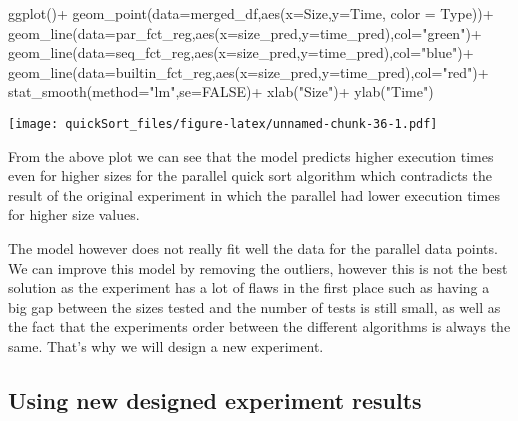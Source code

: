 \documentclass[
]{article}
\newenvironment{Shaded}{\begin{snugshade}}{\end{snugshade}}
\newcommand{\AttributeTok}[1]{\textcolor[rgb]{0.77,0.63,0.00}{#1}}
\newcommand{\ConstantTok}[1]{\textcolor[rgb]{0.00,0.00,0.00}{#1}}
\newcommand{\FunctionTok}[1]{\textcolor[rgb]{0.00,0.00,0.00}{#1}}
\newcommand{\NormalTok}[1]{#1}
\newcommand{\SpecialCharTok}[1]{\textcolor[rgb]{0.00,0.00,0.00}{#1}}
\newcommand{\StringTok}[1]{\textcolor[rgb]{0.31,0.60,0.02}{#1}}
\begin{document}
\begin{Shaded}
\begin{Highlighting}[]
\FunctionTok{ggplot}\NormalTok{()}\SpecialCharTok{+}
\FunctionTok{geom\_point}\NormalTok{(}\AttributeTok{data=}\NormalTok{merged\_df,}\FunctionTok{aes}\NormalTok{(}\AttributeTok{x=}\NormalTok{Size,}\AttributeTok{y=}\NormalTok{Time, }\AttributeTok{color =}\NormalTok{ Type))}\SpecialCharTok{+} \FunctionTok{geom\_line}\NormalTok{(}\AttributeTok{data=}\NormalTok{par\_fct\_reg,}\FunctionTok{aes}\NormalTok{(}\AttributeTok{x=}\NormalTok{size\_pred,}\AttributeTok{y=}\NormalTok{time\_pred),}\AttributeTok{col=}\StringTok{"green"}\NormalTok{)}\SpecialCharTok{+}
\FunctionTok{geom\_line}\NormalTok{(}\AttributeTok{data=}\NormalTok{seq\_fct\_reg,}\FunctionTok{aes}\NormalTok{(}\AttributeTok{x=}\NormalTok{size\_pred,}\AttributeTok{y=}\NormalTok{time\_pred),}\AttributeTok{col=}\StringTok{"blue"}\NormalTok{)}\SpecialCharTok{+}
\FunctionTok{geom\_line}\NormalTok{(}\AttributeTok{data=}\NormalTok{builtin\_fct\_reg,}\FunctionTok{aes}\NormalTok{(}\AttributeTok{x=}\NormalTok{size\_pred,}\AttributeTok{y=}\NormalTok{time\_pred),}\AttributeTok{col=}\StringTok{"red"}\NormalTok{)}\SpecialCharTok{+}
\FunctionTok{stat\_smooth}\NormalTok{(}\AttributeTok{method=}\StringTok{"lm"}\NormalTok{,}\AttributeTok{se=}\ConstantTok{FALSE}\NormalTok{)}\SpecialCharTok{+}
\FunctionTok{xlab}\NormalTok{(}\StringTok{"Size"}\NormalTok{)}\SpecialCharTok{+}
\FunctionTok{ylab}\NormalTok{(}\StringTok{"Time"}\NormalTok{)}
\end{Highlighting}
\end{Shaded}

\texttt{[image: quickSort\_files/figure-latex/unnamed-chunk-36-1.pdf]}

From the above plot we can see that the model predicts higher execution
times even for higher sizes for the parallel quick sort algorithm which
contradicts the result of the original experiment in which the parallel
had lower execution times for higher size values.

The model however does not really fit well the data for the parallel
data points. We can improve this model by removing the outliers, however
this is not the best solution as the experiment has a lot of flaws in
the first place such as having a big gap between the sizes tested and
the number of tests is still small, as well as the fact that the
experiments order between the different algorithms is always the same.
That's why we will design a new experiment.

\hypertarget{using-new-designed-experiment-results}{%
\subsection{Using new designed experiment
results}\label{using-new-designed-experiment-results}}
\end{document}
